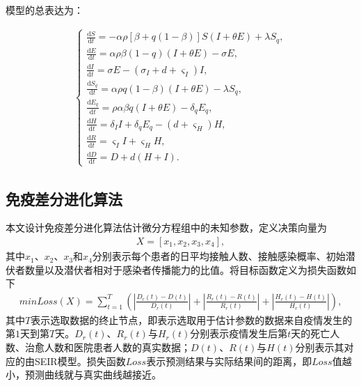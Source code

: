 \documentclass{whutmod}
\begin{document}
			模型的总表达为：
			\begin{spacing}{2}
			\begin{gather}
			\left\{\begin{array}{l}
			\frac{\mathrm{d} S}{\mathrm{d} t}=-\alpha\rho [\beta +q(1-\beta)]S(I+\theta E)+\lambda S_{q},
			\\ \frac{\mathrm{d} E}{\mathrm{d} t}=\alpha\rho\beta(1-q) (I+\theta E)-\sigma E,
			\\ \frac{\mathrm{d} I}{\mathrm{d} t}=\sigma E-(\sigma_I+d+\varsigma_I)I,
			\\ \frac{\mathrm{d} S_q}{\mathrm{d} t}=\alpha\rho q(1-\beta)(I+\theta E)-\lambda S_q,
			\\ \frac{\mathrm{d} E_q}{\mathrm{d} t}=\rho \alpha \beta q(I+\theta E)-\delta_q E_q,
			\\ \frac{\mathrm{d}H }{\mathrm{d} t}=\delta_I I+ \delta_q E_q-(d+\varsigma_H )H,
			\\ \frac{\mathrm{d} R}{\mathrm{d} t}=\varsigma_I I+\varsigma_H H,
			\\\frac{\mathrm{d} D}{\mathrm{d} t}= D + d(H+I).
			\end{array}\right.
			\end{gather}
			\end{spacing}
		\vspace{0pt}	%
		\subsection{免疫差分进化算法}
		本文设计免疫差分进化算法估计微分方程组中的未知参数，定义决策向量为
		\begin{gather}
		X=[x_1,x_2,x_3,x_4],
		\end{gather}
		其中$x_1$、$x_2$、$x_3$和$x_4$分别表示每个患者的日平均接触人数、接触感染概率、初始潜伏者数量以及潜伏者相对于感染者传播能力的比值。将目标函数定义为损失函数如下
		\begin{gather}
		min Loss(X)=\sum_{t=1}^T (|\frac{D_r(t)-D(t)}{D_r(t)}|+|\frac{R_r(t)-R(t)}{R_r(t)}|+|\frac{H_r(t)-H(t)}{H_r(t)}|),
		\end{gather}
		其中$T$表示选取数据的终止节点，即表示选取用于估计参数的数据来自疫情发生的第$1$天到第$T$天。$D_r(t)$、$R_r(t)$与$H_r(t)$分别表示疫情发生后第$t$天的死亡人数、治愈人数和医院患者人数的真实数据；$D(t)$、$R(t)$与$H(t)$分别表示其对应的由SEIR模型。损失函数$Loss$表示预测结果与实际结果间的距离，即$Loss$值越小，预测曲线就与真实曲线越接近。
\end{document}
